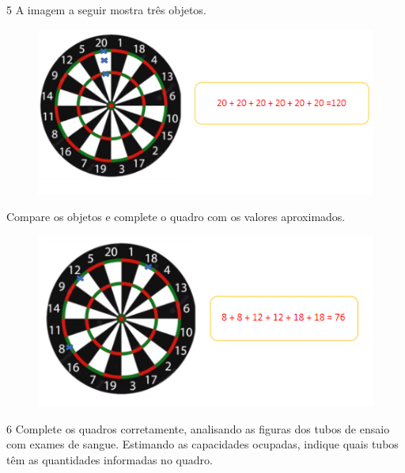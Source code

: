 \num{5} A imagem a seguir mostra três objetos.


\begin{figure}[htpb!]
\includegraphics[width=\textwidth]{./media/image34.png}
\end{figure}

Compare os objetos e complete o quadro com os valores aproximados.

\begin{figure}[htpb!]
\includegraphics[width=\textwidth]{./media/image35.png}
\end{figure}


\pagebreak
\num{6} Complete os quadros corretamente, analisando as figuras dos tubos de
ensaio com exames de sangue. Estimando as capacidades ocupadas, indique
quais tubos têm as quantidades informadas no quadro.

